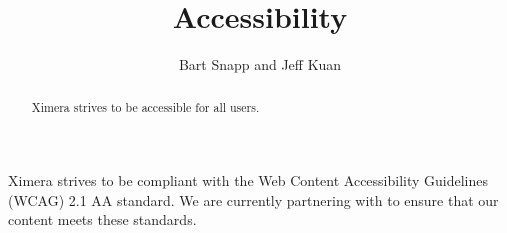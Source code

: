 \documentclass{ximera}
\author{Bart Snapp and Jeff Kuan}
\title{Accessibility}
\begin{document}
\begin{abstract}
Ximera strives to be accessible for all users.
\end{abstract}
\maketitle

Ximera strives to be compliant with the Web Content Accessibility Guidelines (WCAG) 2.1 AA standard. 
We are currently partnering with  to ensure that our content meets these standards.
\end{document}

